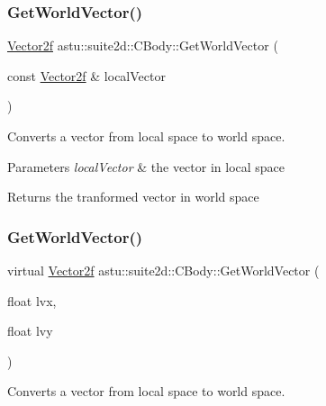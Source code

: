 \subsubsection{\texorpdfstring{Get\+World\+Vector()}{GetWorldVector()}\hspace{0.1cm}{\footnotesize\ttfamily [1/2]}}
{\footnotesize\ttfamily \hyperlink{classastu_1_1Vector2}{Vector2f} astu\+::suite2d\+::\+C\+Body\+::\+Get\+World\+Vector (\begin{DoxyParamCaption}\item[{const \hyperlink{classastu_1_1Vector2}{Vector2f} \&}]{local\+Vector }\end{DoxyParamCaption})\hspace{0.3cm}{\ttfamily [inline]}}

Converts a vector from local space to world space.


\begin{DoxyParams}{Parameters}
{\em local\+Vector} & the vector in local space \\
\hline
\end{DoxyParams}
\begin{DoxyReturn}{Returns}
the tranformed vector in world space 
\end{DoxyReturn}
\mbox{\label{classastu_1_1suite2d_1_1CBody_a50fb6c9131bd42e20def02619526fdff}} 
\subsubsection{\texorpdfstring{Get\+World\+Vector()}{GetWorldVector()}\hspace{0.1cm}{\footnotesize\ttfamily [2/2]}}
{\footnotesize\ttfamily virtual \hyperlink{classastu_1_1Vector2}{Vector2f} astu\+::suite2d\+::\+C\+Body\+::\+Get\+World\+Vector (\begin{DoxyParamCaption}\item[{float}]{lvx,  }\item[{float}]{lvy }\end{DoxyParamCaption})\hspace{0.3cm}{\ttfamily [pure virtual]}}

Converts a vector from local space to world space.


